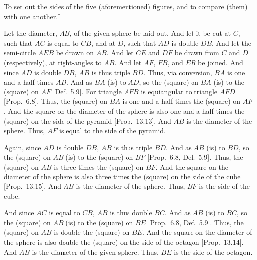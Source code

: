 \begin{Parallel}{}{}
{To set out the sides of the five (aforementioned) figures, and to compare (them)
with one another.$^\dag$

\epsfysize=2.25in
\centerline{}

Let the diameter, $AB$, of the given sphere be laid out. And let it
be cut at $C$, such that $AC$ is equal to $CB$, and at $D$, such
that $AD$ is double $DB$. And let the semi-circle $AEB$ be
drawn on $AB$. And let $CE$ and $DF$ be drawn from $C$
and $D$ (respectively), at right-angles to $AB$. And let $AF$, $FB$,
and $EB$ be joined. And since $AD$ is double $DB$, 
$AB$ is thus triple $BD$. Thus, via conversion, $BA$ is one and
a half times $AD$. And as $BA$ (is) to $AD$, so the (square)
on $BA$ (is) to the (square) on $AF$ [Def.~5.9].  For
triangle $AFB$ is equiangular to triangle $AFD$ [Prop.~6.8]. 
Thus, the (square) on $BA$ is one and a half times the (square)
on $AF$. And the square on the diameter of the sphere
is also one and a half times the (square) on the side of the pyramid
[Prop.~13.13].  And $AB$ is the diameter of the sphere. Thus,
$AF$ is equal to the side of the pyramid.

Again, since $AD$ is double $DB$,  $AB$ is thus triple $BD$. And
as $AB$ (is) to $BD$, so the (square) on $AB$ (is) to the (square)
on $BF$ [Prop.~6.8, Def.~5.9]. Thus, the (square) on $AB$
is three times the (square) on $BF$.  And the square on the diameter of
the sphere is also three times the (square) on the side of the cube [Prop.~13.15]. And $AB$ is the diameter of the sphere. Thus, $BF$ is the
side of the cube.

And since $AC$ is equal to $CB$, $AB$ is thus double $BC$.  And
as $AB$ (is) to $BC$, so the (square) on $AB$ (is) to the (square)
on $BE$ [Prop.~6.8, Def.~5.9]. Thus, the (square) on $AB$
is double the (square) on $BE$. And the square on the diameter
of the sphere is also double the (square) on the side of the octagon [Prop.~13.14]. And $AB$ is the diameter of the given sphere. Thus,
$BE$ is the side of the octagon.

}
\end{Parallel}
